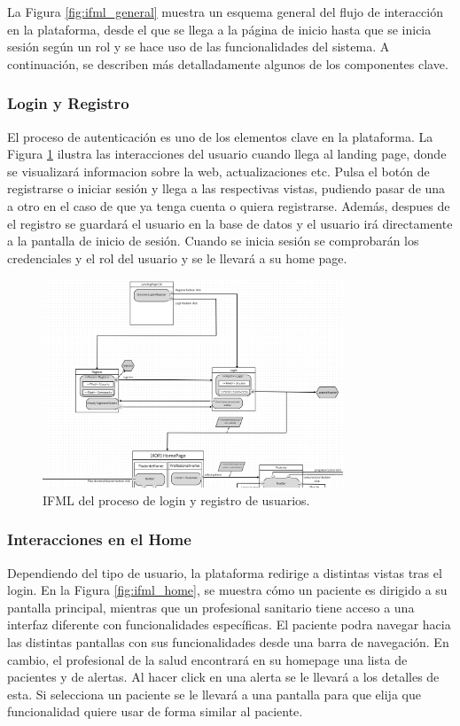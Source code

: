 \documentclass{article}
\begin{document}
La Figura \ref{fig:ifml_general} muestra un esquema general del flujo de interacción en la plataforma, desde el que se llega a la página de inicio hasta que se inicia sesión según un rol y se hace uso de las funcionalidades del sistema. A continuación, se describen más detalladamente algunos de los componentes clave.
\newpage
\subsubsection{Login y Registro}

El proceso de autenticación es uno de los elementos clave en la plataforma. La Figura \ref{fig:ifml_login} ilustra las interacciones del usuario cuando llega al landing page, donde se visualizará informacion sobre la web, actualizaciones etc. Pulsa el botón de registrarse o iniciar sesión y llega a las respectivas vistas, pudiendo pasar de una a otro en el caso de que ya tenga cuenta o quiera registrarse. Además, despues de el registro se guardará el usuario en la base de datos y el usuario irá directamente a la pantalla de inicio de sesión. Cuando se inicia sesión se comprobarán los credenciales y el rol del usuario y se le llevará a su home page.

\begin{figure}[H]
	\centering
	\includegraphics[width=0.8\textwidth]{images/ifml_login.png}
	\caption{IFML del proceso de login y registro de usuarios.}
	\label{fig:ifml_login}
\end{figure}

\subsubsection{Interacciones en el Home}

Dependiendo del tipo de usuario, la plataforma redirige a distintas vistas tras el login. En la Figura \ref{fig:ifml_home}, se muestra cómo un paciente es dirigido a su pantalla principal, mientras que un profesional sanitario tiene acceso a una interfaz diferente con funcionalidades específicas. El paciente podra navegar hacia las distintas pantallas con sus funcionalidades desde una barra de navegación. En cambio, el profesional de la salud encontrará en su homepage una lista de pacientes y de alertas. Al hacer click en una alerta se le llevará a los detalles de esta. Si selecciona un paciente se le llevará a una pantalla para que elija que funcionalidad quiere usar de forma similar al paciente.
\end{document}
